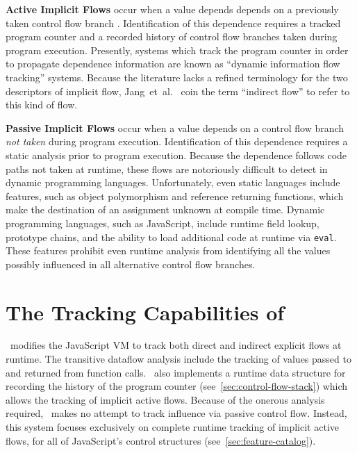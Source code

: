 \begin{description}
\item{
\textbf{Active Implicit Flows} occur when a value depends depends on a previously taken control flow branch .
Identification of this dependence requires a tracked program counter and a recorded history of control flow branches taken during program execution.
Presently, systems which track the program counter in order to propagate dependence information are known as ``dynamic information flow tracking'' systems.
Because the literature lacks a refined terminology for the two descriptors of implicit flow, Jang~et~al.~\cite{jang.etal+10} coin the term ``indirect flow'' to refer to this kind of flow.
}

\item{
\textbf{Passive Implicit Flows} occur when a value depends on a control flow branch \emph{not taken} during program execution.
Identification of this dependence requires a static analysis prior to program execution.
Because the dependence follows code paths not taken at runtime, these flows are notoriously difficult to detect in dynamic programming languages.
Unfortunately, even static languages include features, such as object polymorphism and reference returning functions, which make the destination of an assignment unknown at compile time.
Dynamic programming languages, such as JavaScript, include runtime field lookup, prototype chains, and the ability to load additional code at runtime via \texttt{eval}.
These features prohibit even runtime analysis from identifying all the values possibly influenced in all alternative control flow branches.
}

\end{description}

\section{The Tracking Capabilities of \FlowCore}
\label{sec:tracking-capabilities}

\FlowCore\ modifies the JavaScript VM to track both direct and indirect explicit flows at runtime.
The transitive dataflow analysis include the tracking of values passed to and returned from function calls.
\FlowCore\ also implements a runtime data structure for recording the history of the program counter (see~\ref{sec:control-flow-stack}) which allows the tracking of implicit active flows.
Because of the onerous analysis required, \FlowCore\ makes no attempt to track influence via passive control flow.
Instead, this system focuses exclusively on complete runtime tracking of implicit active flows, for all of JavaScript's control structures (see~\ref{sec:feature-catalog}).
